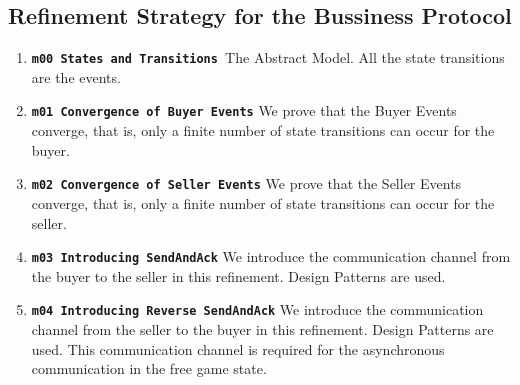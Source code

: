 \subsection{Refinement Strategy for the Bussiness Protocol}
\begin{enumerate}
\item \texttt{\bf m00 States and Transitions }The Abstract Model. All the state transitions are the events.
\item \texttt{\bf m01 Convergence of Buyer Events} We prove that the Buyer Events converge, that is, only a finite number of state transitions can occur for the buyer.
\item \texttt{\bf m02 Convergence of Seller Events} We prove that the Seller Events converge, that is, only a finite number of state transitions can occur for the seller.
\item \texttt{\bf m03 Introducing SendAndAck} We introduce the communication channel from the buyer to the seller in this refinement. Design Patterns are used.
\item \texttt{\bf m04 Introducing Reverse SendAndAck} We introduce the communication channel from the seller to the buyer in this refinement. Design Patterns are used. This communication channel is required for the asynchronous communication in the free game state.
\end{enumerate}

